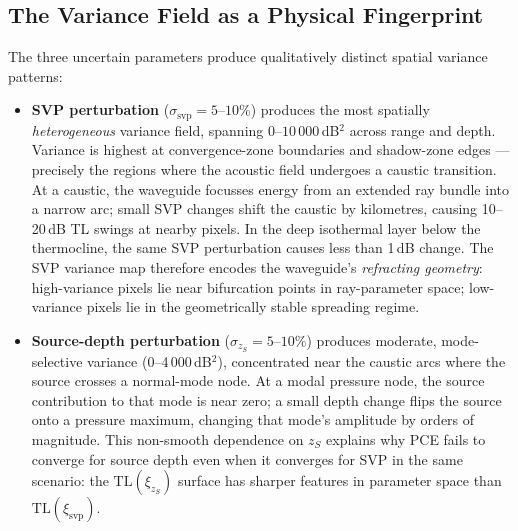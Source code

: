 \documentclass[11pt,a4paper]{article}
\begin{document}
\subsection{The Variance Field as a Physical Fingerprint}
\label{sec:variance_fingerprint}

The three uncertain parameters produce qualitatively distinct spatial variance patterns:

\begin{itemize}

  \item \textbf{SVP perturbation} ($\sigma_\text{svp} = 5$--$10\%$) produces the most
        spatially \emph{heterogeneous} variance field, spanning
        $0$--$10\,000$\,dB$^2$ across range and depth.
        Variance is highest at convergence-zone boundaries and shadow-zone edges ---
        precisely the regions where the acoustic field undergoes a caustic transition.
        At a caustic, the waveguide focusses energy from an extended ray bundle into a
        narrow arc; small SVP changes shift the caustic by kilometres, causing 10--20\,dB
        TL swings at nearby pixels.
        In the deep isothermal layer below the thermocline, the same SVP perturbation
        causes less than 1\,dB change.
        The SVP variance map therefore encodes the waveguide's \emph{refracting geometry}:
        high-variance pixels lie near bifurcation points in ray-parameter space; low-variance
        pixels lie in the geometrically stable spreading regime.

  \item \textbf{Source-depth perturbation} ($\sigma_{z_S} = 5$--$10\%$) produces
        moderate, mode-selective variance (0--4\,000\,dB$^2$), concentrated near the
        caustic arcs where the source crosses a normal-mode node.
        At a modal pressure node, the source contribution to that mode is near zero;
        a small depth change flips the source onto a pressure maximum, changing that
        mode's amplitude by orders of magnitude.
        This non-smooth dependence on $z_S$ explains why PCE fails to converge for
        source depth even when it converges for SVP in the same scenario:
        the $\mathrm{TL}(\xi_{z_S})$ surface has sharper features in parameter space
        than $\mathrm{TL}(\xi_\text{svp})$.


\end{itemize}
\end{document}
